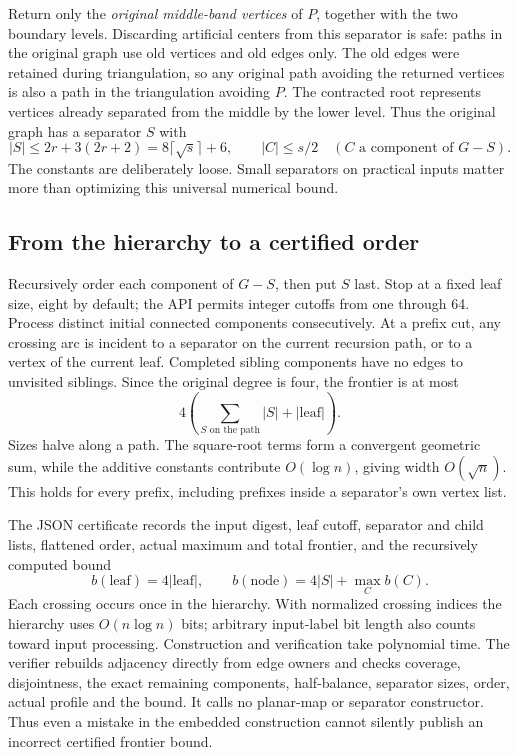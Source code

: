 Return only the \emph{original middle-band vertices} of $P$, together with
the two boundary levels.  Discarding artificial centers from this separator
is safe: paths in the original graph use old vertices and old edges only.
The old edges were retained during triangulation, so any original path
avoiding the returned vertices is also a path in the triangulation avoiding
$P$.  The contracted root represents vertices already separated from the
middle by the lower level.  Thus the original graph has a separator $S$ with
\[
 |S|\le 2r+3(2r+2)=8\lceil\sqrt{s}\rceil+6,
 \qquad |C|\le s/2\quad(C\text{ a component of }G-S).
\]
The constants are deliberately loose.  Small separators on practical inputs
matter more than optimizing this universal numerical bound.

\subsection{From the hierarchy to a certified order}

Recursively order each component of $G-S$, then put $S$ last.  Stop at a
fixed leaf size, eight by default; the API permits integer cutoffs from one
through 64.  Process distinct initial connected components consecutively.
At a prefix cut, any crossing arc is incident to a separator on the current
recursion path, or to a vertex of the current leaf.  Completed sibling
components have no edges to unvisited siblings.  Since the original degree
is four, the frontier is at most
\[
 4\left(\sum_{S\text{ on the path}}|S|+|\text{leaf}|\right).
\]
Sizes halve along a path.  The square-root terms form a convergent geometric
sum, while the additive constants contribute $O(\log n)$, giving width
$O(\sqrt n)$.  This holds for every prefix, including prefixes inside a
separator's own vertex list.

The JSON certificate records the input digest, leaf cutoff, separator and
child lists, flattened order, actual maximum and total frontier, and the
recursively computed bound
\[
 b(\text{leaf})=4|\text{leaf}|,\qquad
 b(\text{node})=4|S|+\max_C b(C).
\]
Each crossing occurs once in the hierarchy.  With normalized crossing
indices the hierarchy uses $O(n\log n)$ bits; arbitrary input-label bit
length also counts toward input processing.  Construction and verification
take polynomial time.  The verifier rebuilds adjacency directly from edge
owners and checks coverage, disjointness, the exact remaining components,
half-balance, separator sizes, order, actual profile and the bound.  It calls
no planar-map or separator constructor.  Thus even a mistake in the embedded
construction cannot silently publish an incorrect certified frontier bound.

